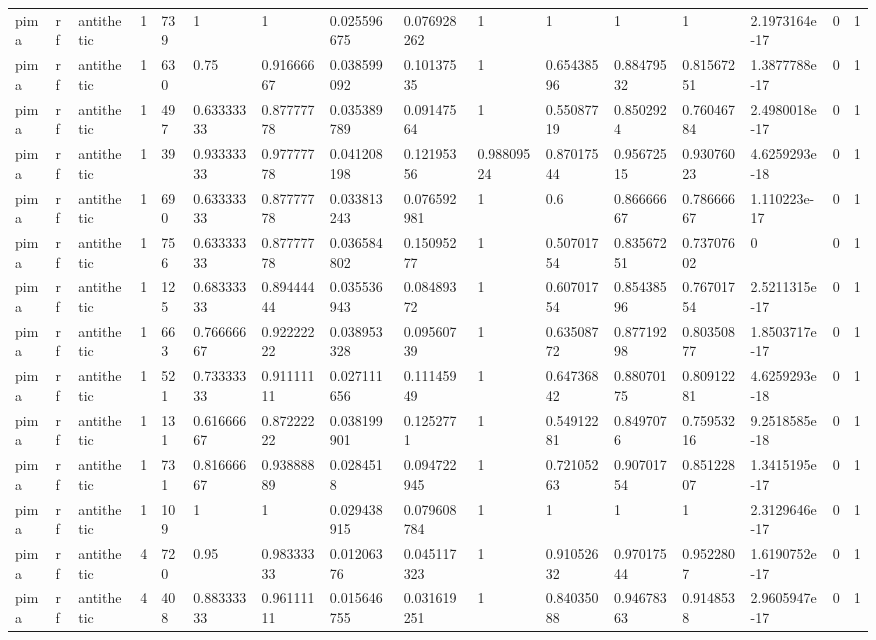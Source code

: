 \begin{tabular}{llllllllllllllll}
pima & rf & antithetic & 1 & 739 & 1 & 1 & 0.025596675 & 0.076928262 & 1 & 1 & 1 & 1 & 2.1973164e-17 & 0 & 1 \\
pima & rf & antithetic & 1 & 630 & 0.75 & 0.91666667 & 0.038599092 & 0.10137535 & 1 & 0.65438596 & 0.88479532 & 0.81567251 & 1.3877788e-17 & 0 & 1 \\
pima & rf & antithetic & 1 & 497 & 0.63333333 & 0.87777778 & 0.035389789 & 0.09147564 & 1 & 0.55087719 & 0.8502924 & 0.76046784 & 2.4980018e-17 & 0 & 1 \\
pima & rf & antithetic & 1 & 39 & 0.93333333 & 0.97777778 & 0.041208198 & 0.12195356 & 0.98809524 & 0.87017544 & 0.95672515 & 0.93076023 & 4.6259293e-18 & 0 & 1 \\
pima & rf & antithetic & 1 & 690 & 0.63333333 & 0.87777778 & 0.033813243 & 0.076592981 & 1 & 0.6 & 0.86666667 & 0.78666667 & 1.110223e-17 & 0 & 1 \\
pima & rf & antithetic & 1 & 756 & 0.63333333 & 0.87777778 & 0.036584802 & 0.15095277 & 1 & 0.50701754 & 0.83567251 & 0.73707602 & 0 & 0 & 1 \\
pima & rf & antithetic & 1 & 125 & 0.68333333 & 0.89444444 & 0.035536943 & 0.08489372 & 1 & 0.60701754 & 0.85438596 & 0.76701754 & 2.5211315e-17 & 0 & 1 \\
pima & rf & antithetic & 1 & 663 & 0.76666667 & 0.92222222 & 0.038953328 & 0.09560739 & 1 & 0.63508772 & 0.87719298 & 0.80350877 & 1.8503717e-17 & 0 & 1 \\
pima & rf & antithetic & 1 & 521 & 0.73333333 & 0.91111111 & 0.027111656 & 0.11145949 & 1 & 0.64736842 & 0.88070175 & 0.80912281 & 4.6259293e-18 & 0 & 1 \\
pima & rf & antithetic & 1 & 131 & 0.61666667 & 0.87222222 & 0.038199901 & 0.1252771 & 1 & 0.54912281 & 0.8497076 & 0.75953216 & 9.2518585e-18 & 0 & 1 \\
pima & rf & antithetic & 1 & 731 & 0.81666667 & 0.93888889 & 0.0284518 & 0.094722945 & 1 & 0.72105263 & 0.90701754 & 0.85122807 & 1.3415195e-17 & 0 & 1 \\
pima & rf & antithetic & 1 & 109 & 1 & 1 & 0.029438915 & 0.079608784 & 1 & 1 & 1 & 1 & 2.3129646e-17 & 0 & 1 \\
pima & rf & antithetic & 4 & 720 & 0.95 & 0.98333333 & 0.01206376 & 0.045117323 & 1 & 0.91052632 & 0.97017544 & 0.9522807 & 1.6190752e-17 & 0 & 1 \\
pima & rf & antithetic & 4 & 408 & 0.88333333 & 0.96111111 & 0.015646755 & 0.031619251 & 1 & 0.84035088 & 0.94678363 & 0.9148538 & 2.9605947e-17 & 0 & 1 \\

\end{tabular}
